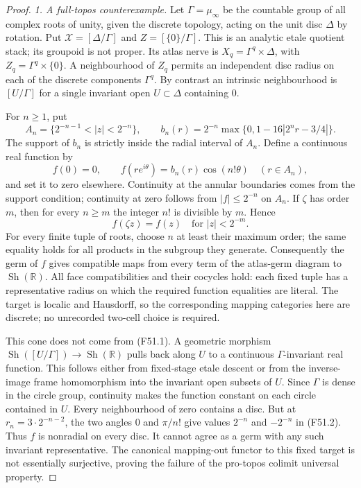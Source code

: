 \begin{proof}
\emph{1. A full-topos counterexample.}
Let $\Gamma=\mu_\infty$ be the countable group of all complex roots
of unity, given the discrete topology, acting on the unit disc
$\Delta$ by rotation. Put
$\mathcal X=[\Delta/\Gamma]$ and $Z=[\{0\}/\Gamma]$.
This is an analytic etale quotient stack; its groupoid is not proper.
Its atlas nerve is $X_q=\Gamma^q\times\Delta$, with
$Z_q=\Gamma^q\times\{0\}$. A neighbourhood of $Z_q$ permits an
independent disc radius on each of the discrete components
$\Gamma^q$. By contrast an intrinsic neighbourhood is $[U/\Gamma]$
for a single invariant open $U\subset\Delta$ containing $0$.

For $n\ge1$, put
\[
 A_n=\{2^{-n-1}<|z|<2^{-n}\},\qquad
 b_n(r)=2^{-n}\max\{0,1-16|2^nr-3/4|\}.
\]
The support of $b_n$ is strictly inside the radial interval of
$A_n$. Define a continuous real function by
\[
 f(0)=0,\qquad
 f(re^{i\theta})=b_n(r)\cos(n!\theta)\quad(r\in A_n),
                                                        \tag{F51.2}
\]
and set it to zero elsewhere. Continuity at the annular boundaries
comes from the support condition; continuity at zero follows from
$|f|\le2^{-n}$ on $A_n$.
If $\zeta$ has order $m$, then for every $n\ge m$ the integer
$n!$ is divisible by $m$. Hence
\[
 f(\zeta z)=f(z)\quad\text{for }|z|<2^{-m}.                \tag{F51.3}
\]
For every finite tuple of roots, choose $n$ at least their maximum
order; the same equality holds for all products in the subgroup
they generate. Consequently the germ of $f$ gives compatible maps
from every term of the atlas-germ diagram to
$\operatorname{Sh}(\mathbb R)$. All face compatibilities and their
cocycles hold: each fixed tuple has a representative radius on
which the required function equalities are literal. The target is
localic and Hausdorff, so the corresponding mapping categories here
are discrete; no unrecorded two-cell choice is required.

This cone does not come from (F51.1). A geometric morphism
$\operatorname{Sh}([U/\Gamma])\to\operatorname{Sh}(\mathbb R)$
pulls back along $U$ to a continuous $\Gamma$-invariant real
function. This follows either from fixed-stage etale descent or from
the inverse-image frame homomorphism into the invariant open subsets
of $U$. Since $\Gamma$ is dense in the circle group, continuity makes
the function constant on each circle contained in $U$.
Every neighbourhood of zero contains a disc. But at
$r_n=3\cdot2^{-n-2}$, the two angles $0$ and $\pi/n!$ give
values $2^{-n}$ and $-2^{-n}$ in (F51.2). Thus $f$ is nonradial on
every disc. It cannot agree as a germ with any such invariant
representative. The canonical mapping-out functor to this fixed
target is not essentially surjective, proving the failure of the
pro-topos colimit universal property.


\end{proof}
